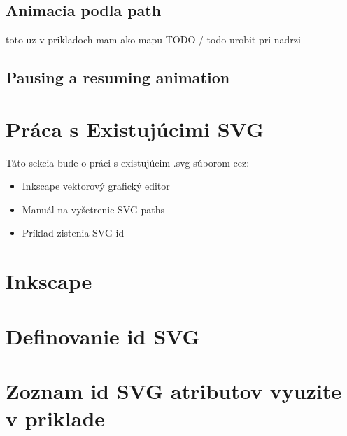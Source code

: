 \subsection{Animacia podla path}
toto uz v prikladoch mam ako mapu TODO /
todo urobit pri nadrzi 

\subsection{Pausing a resuming animation}

















\section {Práca s Existujúcimi SVG}

Táto sekcia bude o práci s existujúcim .svg súborom cez: 
\begin{itemize}
	\item Inkscape vektorový grafický editor
	\item Manuál na vyšetrenie SVG paths
	\item Príklad zistenia SVG id
\end{itemize}


\section{Inkscape}
\section{Definovanie id SVG}
\section{Zoznam id SVG atributov vyuzite v priklade}